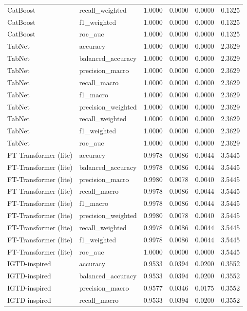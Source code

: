 \begin{tabular}{llrrrr}
CatBoost & recall_weighted & 1.0000 & 0.0000 & 0.0000 & 0.1325 \\
CatBoost & f1_weighted & 1.0000 & 0.0000 & 0.0000 & 0.1325 \\
CatBoost & roc_auc & 1.0000 & 0.0000 & 0.0000 & 0.1325 \\
TabNet & accuracy & 1.0000 & 0.0000 & 0.0000 & 2.3629 \\
TabNet & balanced_accuracy & 1.0000 & 0.0000 & 0.0000 & 2.3629 \\
TabNet & precision_macro & 1.0000 & 0.0000 & 0.0000 & 2.3629 \\
TabNet & recall_macro & 1.0000 & 0.0000 & 0.0000 & 2.3629 \\
TabNet & f1_macro & 1.0000 & 0.0000 & 0.0000 & 2.3629 \\
TabNet & precision_weighted & 1.0000 & 0.0000 & 0.0000 & 2.3629 \\
TabNet & recall_weighted & 1.0000 & 0.0000 & 0.0000 & 2.3629 \\
TabNet & f1_weighted & 1.0000 & 0.0000 & 0.0000 & 2.3629 \\
TabNet & roc_auc & 1.0000 & 0.0000 & 0.0000 & 2.3629 \\
FT-Transformer (lite) & accuracy & 0.9978 & 0.0086 & 0.0044 & 3.5445 \\
FT-Transformer (lite) & balanced_accuracy & 0.9978 & 0.0086 & 0.0044 & 3.5445 \\
FT-Transformer (lite) & precision_macro & 0.9980 & 0.0078 & 0.0040 & 3.5445 \\
FT-Transformer (lite) & recall_macro & 0.9978 & 0.0086 & 0.0044 & 3.5445 \\
FT-Transformer (lite) & f1_macro & 0.9978 & 0.0086 & 0.0044 & 3.5445 \\
FT-Transformer (lite) & precision_weighted & 0.9980 & 0.0078 & 0.0040 & 3.5445 \\
FT-Transformer (lite) & recall_weighted & 0.9978 & 0.0086 & 0.0044 & 3.5445 \\
FT-Transformer (lite) & f1_weighted & 0.9978 & 0.0086 & 0.0044 & 3.5445 \\
FT-Transformer (lite) & roc_auc & 1.0000 & 0.0000 & 0.0000 & 3.5445 \\
IGTD-inspired & accuracy & 0.9533 & 0.0394 & 0.0200 & 0.3552 \\
IGTD-inspired & balanced_accuracy & 0.9533 & 0.0394 & 0.0200 & 0.3552 \\
IGTD-inspired & precision_macro & 0.9577 & 0.0346 & 0.0175 & 0.3552 \\
IGTD-inspired & recall_macro & 0.9533 & 0.0394 & 0.0200 & 0.3552 \\

\end{tabular}
